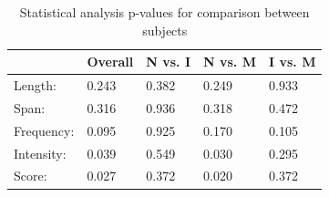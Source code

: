 \begin{table}[h]
	\begin{tabular}{|l|l|l|l|l|}
		\hline
		& Overall & N vs. I & N vs. M & I vs. M \\ \hline
		Length:    & 0.243   & 0.382   & 0.249   & 0.933   \\ \hline
		Span:      & 0.316   & 0.936   & 0.318   & 0.472   \\ \hline
		Frequency: & 0.095   & 0.925   & 0.170   & 0.105   \\ \hline
		Intensity: & 0.039   & 0.549   & 0.030   & 0.295   \\ \hline
		Score:     & 0.027   & 0.372   & 0.020   & 0.372   \\ \hline
	\end{tabular}
	\caption{Statistical analysis p-values for comparison between subjects}
	\label{tab:pValues}
\end{table}


